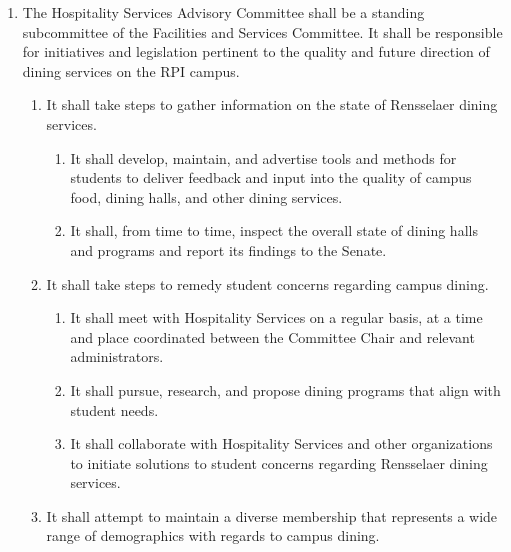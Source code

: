 \documentclass{bylaws}
\begin{document}
\begin{enumerate}
\item The Hospitality Services Advisory Committee shall be a standing subcommittee of the Facilities and Services Committee. It
shall be responsible for initiatives and legislation pertinent to the quality and future direction of dining services on the RPI
campus.
\begin{enumerate}
\item It shall take steps to gather information on the state of Rensselaer dining services.
\begin{enumerate}
\item It shall develop, maintain, and advertise tools and methods for students to deliver feedback and input into the quality of
campus food, dining halls, and other dining services.
\item It shall, from time to time, inspect the overall state of dining halls and programs and report its findings to the Senate.
\end{enumerate}
\item It shall take steps to remedy student concerns regarding campus dining.
\begin{enumerate}
\item It shall meet with Hospitality Services on a regular basis, at a time and place coordinated between the Committee Chair
and relevant administrators.
\item It shall pursue, research, and propose dining programs that align with student needs.
\item It shall collaborate with Hospitality Services and other organizations to initiate solutions to student concerns regarding
Rensselaer dining services.
\end{enumerate}

\item It shall attempt to maintain a diverse membership that represents a wide range of demographics with regards to campus
dining.
\end{enumerate}


\end{enumerate}
\end{document}
